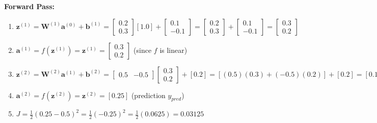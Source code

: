 \documentclass{article}
\newcommand{\bW}{\bm{W}}
\newcommand{\bb}{\bm{b}}
\newcommand{\bz}{\bm{z}}
\newcommand{\ba}{\bm{a}}
\begin{document}
\textbf{Forward Pass:}
\begin{enumerate}
    \item $\bz^{(1)} = \bW^{(1)} \ba^{(0)} + \bb^{(1)} = \begin{bmatrix} 0.2 \\ 0.3 \end{bmatrix} [1.0] + \begin{bmatrix} 0.1 \\ -0.1 \end{bmatrix} = \begin{bmatrix} 0.2 \\ 0.3 \end{bmatrix} + \begin{bmatrix} 0.1 \\ -0.1 \end{bmatrix} = \begin{bmatrix} 0.3 \\ 0.2 \end{bmatrix}$
    \item $\ba^{(1)} = f(\bz^{(1)}) = \bz^{(1)} = \begin{bmatrix} 0.3 \\ 0.2 \end{bmatrix}$ (since $f$ is linear)
    \item $\bz^{(2)} = \bW^{(2)} \ba^{(1)} + \bb^{(2)} = \begin{bmatrix} 0.5 & -0.5 \end{bmatrix} \begin{bmatrix} 0.3 \\ 0.2 \end{bmatrix} + [0.2] = [(0.5)(0.3) + (-0.5)(0.2)] + [0.2] = [0.15 - 0.10] + [0.2] = [0.05] + [0.2] = [0.25]$
    \item $\ba^{(2)} = f(\bz^{(2)}) = \bz^{(2)} = [0.25]$ (prediction $y_{pred}$)
    \item $J = \frac{1}{2} (0.25 - 0.5)^2 = \frac{1}{2} (-0.25)^2 = \frac{1}{2} (0.0625) = 0.03125$
\end{enumerate}
\end{document}
